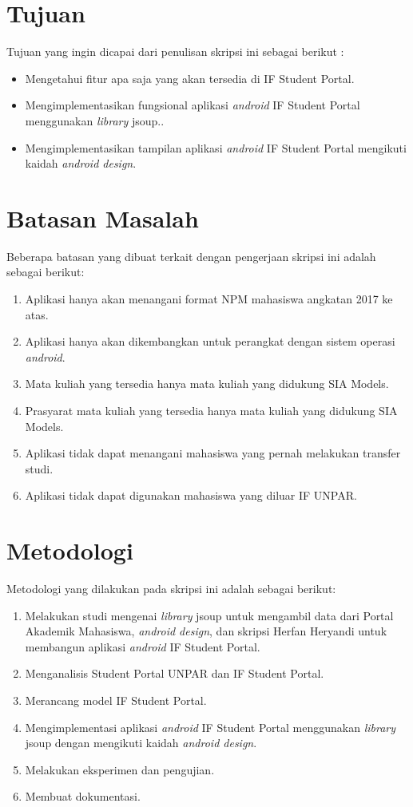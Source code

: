 \section{Tujuan}
\label{sec:tujuan}
Tujuan yang ingin dicapai dari penulisan skripsi ini sebagai berikut :
\begin{itemize}
    \item Mengetahui fitur apa saja yang akan tersedia di IF Student Portal.
    \item Mengimplementasikan fungsional aplikasi \textit{android} IF Student Portal menggunakan \textit{library} jsoup..
    \item Mengimplementasikan tampilan aplikasi \textit{android} IF Student Portal mengikuti kaidah \textit{android design}.
    
\end{itemize}

\section{Batasan Masalah}
\label{sec:batasan}
Beberapa batasan yang dibuat terkait dengan pengerjaan skripsi ini adalah sebagai berikut:
\begin{enumerate}
	\item Aplikasi hanya akan menangani format NPM mahasiswa angkatan 2017 ke atas.
	\item Aplikasi hanya akan dikembangkan untuk perangkat dengan sistem operasi \textit{android}.
	\item Mata kuliah yang tersedia hanya mata kuliah yang didukung SIA Models.
	\item Prasyarat mata kuliah yang tersedia hanya mata kuliah yang didukung SIA Models.
	\item Aplikasi tidak dapat menangani mahasiswa yang pernah melakukan transfer studi.
	\item Aplikasi tidak dapat digunakan mahasiswa yang diluar IF UNPAR.
\end{enumerate}

\section{Metodologi}
\label{sec:metlit}
Metodologi yang dilakukan pada skripsi ini adalah sebagai berikut:

\begin{enumerate}
	\item Melakukan studi mengenai \textit{library} jsoup untuk mengambil data dari Portal Akademik Mahasiswa, \textit{android design}, dan skripsi Herfan Heryandi untuk membangun aplikasi \textit{android} IF Student Portal.
	\item Menganalisis Student Portal UNPAR dan IF Student Portal.
	\item Merancang model IF Student Portal.
	\item Mengimplementasi aplikasi \textit{android} IF Student Portal menggunakan \textit{library} jsoup dengan mengikuti kaidah \textit{android design}.
	\item Melakukan eksperimen dan pengujian.
	\item Membuat dokumentasi.
\end{enumerate}



